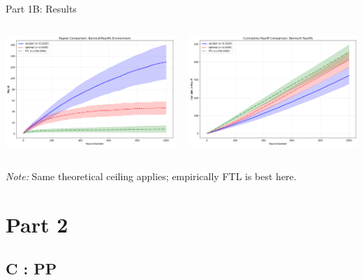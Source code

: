 \documentclass{beamer}
\begin{document}
\begin{frame}{Part 1B: Results}
\begin{columns}[T,onlytextwidth]
  \centering
  \includegraphics[width=\linewidth]{../figures/BP_regret.png}

  \centering
  \includegraphics[width=\linewidth]{figures/BP_payoff.png}
\end{columns}
\vspace{0.3em}
\small \textit{Note:} Same theoretical ceiling applies; empirically FTL is best here.
\end{frame}

\section{Part 2}

\subsection{C : PP}
\end{document}

